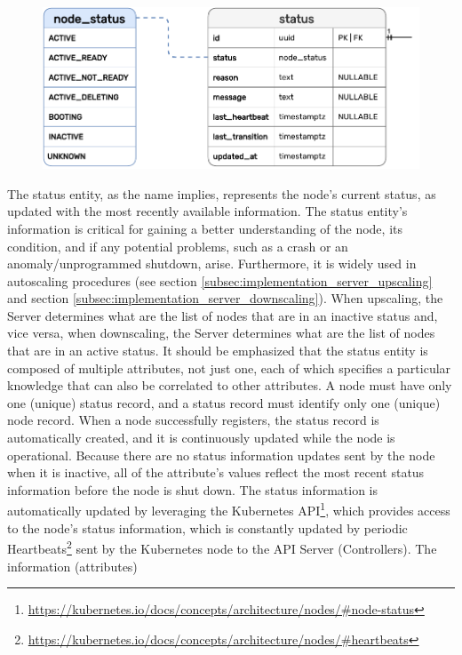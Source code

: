 \begin{figure}[htbp]
  \centering
  \includegraphics[width=.75\textwidth]{images/implementation/erm_status.pdf}
\end{figure}

The status entity, as the name implies, represents the node's current status, as
updated with the most recently available information.
\newline
The status entity's information is critical for gaining a better understanding
of the node, its condition, and if any potential problems, such as a crash or an
anomaly/unprogrammed shutdown, arise. Furthermore, it is widely used in
autoscaling procedures (see section \ref{subsec:implementation_server_upscaling}
and section \ref{subsec:implementation_server_downscaling}). When upscaling, the
Server determines what are the list of nodes that are in an inactive status and,
vice versa, when downscaling, the Server determines what are the list of nodes that
are in an active status. It should be emphasized that the status entity is
composed of multiple attributes, not just one, each of which specifies a
particular knowledge that can also be correlated to other attributes.
\newline
A node must have only one (unique) status record, and a status record must
identify only one (unique) node record. When a node successfully registers, the
status record is automatically created, and it is continuously updated while the
node is operational. Because there are no status information updates sent by the
node when it is inactive, all of the attribute's values reflect the most recent status
information before the node is shut down.
\newline
The status information is automatically updated by leveraging the Kubernetes API\footnote{\url{https://kubernetes.io/docs/concepts/architecture/nodes/\#node-status}},
which provides access to the node's status information, which is constantly
updated by periodic Heartbeats\footnote{\url{https://kubernetes.io/docs/concepts/architecture/nodes/\#heartbeats}}
sent by the Kubernetes node to the API Server (Controllers). The information (attributes)

